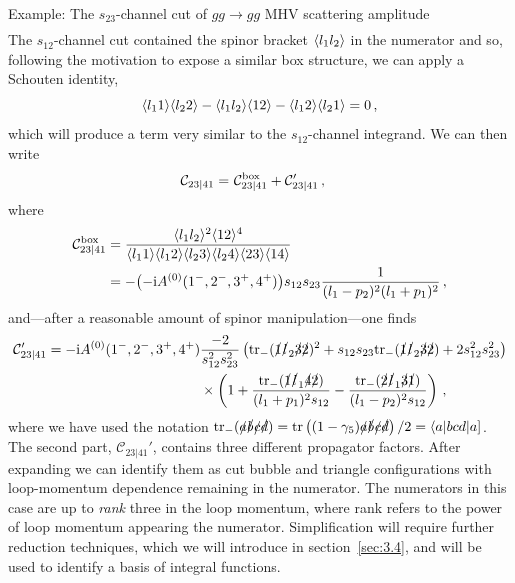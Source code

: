 \begin{example}{Example: The $s_{23}$-channel cut of $gg\to gg$ MHV scattering amplitude}
\begin{align}
\end{align}
The $s_{12}$-channel cut contained the spinor bracket $\langle l_1 l_2 \rangle$ in the numerator and so, following the motivation to expose a similar box structure, we can apply a Schouten identity,
\begin{equation}
  \langle l_1 1 \rangle\langle l_2 2 \rangle - \langle l_1 l_2 \rangle\langle 1 2 \rangle - \langle l_1 2 \rangle\langle l_2 1 \rangle = 0 \,,
\end{equation}
which will produce a term very similar to the $s_{12}$-channel integrand. We can then write
\begin{align}
  \mathcal{C}_{23|41} = \ & \mathcal{C}_{23|41}^{\rm box} + \mathcal{C}_{23|41}' \,,
  \label{eq:tchannelcut1}
\end{align}
where
\begin{align} 
  \mathcal{C}_{23|41}^{\rm box} & =  \frac{\langle l_1 l_2 \rangle^2\langle 1 2 \rangle^4}{\langle l_1 1 \rangle\langle l_1 2 \rangle\langle l_2 3 \rangle\langle l_2 4 \rangle\langle 2 3 \rangle\langle 1 4 \rangle}\nonumber\\
  & = - \bigl(-\mathrm{i} A^{(0)}(1^-,2^-,3^+,4^+) \bigr) s_{12} s_{23} \frac{1}{(l_1-p_2)^2 (l_1+p_1)^2} \,,
  \label{eq:tchannelcut2}
\end{align}
and---after a reasonable amount of spinor manipulation---one finds
\begin{align}
  \mathcal{C}_{23|41}' = -\mathrm{i} A^{(0)}(1^-,2^-,3^+,4^+) &\frac{- 2}{s_{12}^2s_{23}^2}\left( {\rm tr}_-( \slashed{1} \slashed{l}_2 \slashed{3} \slashed{2} )^2 + s_{12}s_{23}{\rm tr}_-( \slashed{1} \slashed{l}_2 \slashed{3} \slashed{2} ) + 2 s_{12}^2s_{23}^2 \right)\nonumber\\&\times
  \left( 1 + \frac{{\rm tr}_-( \slashed{1} \slashed{l}_1 \slashed{4} \slashed{2} )}{(l_1+p_1)^2 s_{12}} - \frac{{\rm tr}_-( \slashed{2} \slashed{l}_1 \slashed{3} \slashed{1} )}{(l_1-p_2)^2 s_{12}} \right) \,,
  \label{eq:tchannelcut3}
\end{align}
where we have used the notation ${\rm tr}_-( \slashed{a} \slashed{b} \slashed{c} \slashed{d} ) = {\rm tr}\left(
(1-\gamma_5)\slashed{a}\slashed{b}\slashed{c}\slashed{d} \right)/2 =
\langle a | bcd | a ]$. The second part, $\mathcal{C}_{23|41}'$, contains three different propagator factors. After expanding
we can identify them as cut bubble and triangle configurations with loop-momentum dependence remaining in the numerator. The numerators in this case are up
to \emph{rank} three in the loop momentum, where rank refers to the power of loop momentum appearing the numerator. Simplification will require further
reduction techniques, which we will introduce in section~\ref{sec:3.4}, and will be used to identify a basis of integral functions. 
\end{example}

